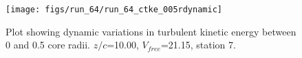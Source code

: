 \begin{figure}[H]
\centering
\texttt{[image: figs/run\_64/run\_64\_ctke\_005rdynamic]}
\caption{Plot showing dynamic variations in turbulent kinetic energy between 0 and 0.5 core radii. $z/c$=10.00, $V_{free}$=21.15, station 7.}
\end{figure}


